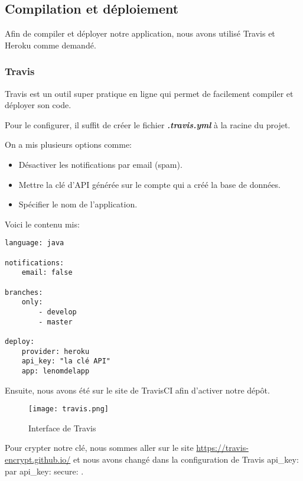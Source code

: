 \subsection{Compilation et déploiement}
Afin de compiler et déployer notre application, nous avons utilisé Travis et Heroku comme demandé.

\subsubsection{Travis}

Travis est un outil super pratique en ligne qui permet de facilement compiler et déployer son code.

Pour le configurer, il suffit de créer le fichier \og{}\textit{\textbf{.travis.yml}} \fg{} à la racine du projet.

On a mis plusieurs options comme:

\begin{itemize}
	\item Désactiver les notifications par email (spam).
	\item Mettre la clé d'API générée sur le compte qui a créé la base de données.
	\item Spécifier le nom de l'application.
\end{itemize}

Voici le contenu mis:

\begin{lstlisting}
language: java

notifications:
    email: false

branches:
    only:
        - develop
        - master

deploy:
    provider: heroku
    api_key: "la clé API"
    app: lenomdelapp
\end{lstlisting}

\clearpage

Ensuite, nous avons été sur le site de TravisCI afin d'activer notre dépôt.

\begin{figure}[ht]
	\centering
	\texttt{[image: travis.png]}
	\caption{Interface de Travis}
\end{figure}

Pour crypter notre clé, nous sommes aller sur le site \url{https://travis-encrypt.github.io/} et nous avons changé dans la configuration de Travis \og{}api\_key: \fg{} par \og{}api\_key: secure: \fg{}.

\clearpage

